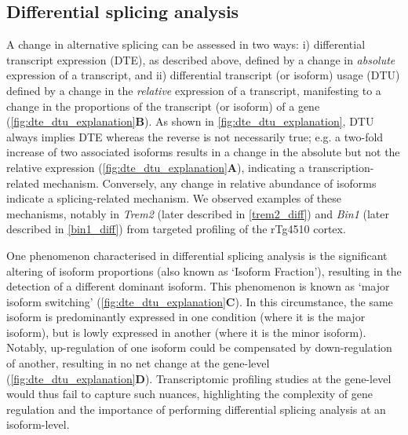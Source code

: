 \subsection{Differential splicing analysis}\label{intro:dtu}
A change in alternative splicing can be assessed in two ways: i) differential transcript expression (DTE), as described above, defined by a change in \textit{absolute} expression of a transcript, and ii) differential transcript (or isoform) usage (DTU) defined by a change in the \textit{relative} expression of a transcript, manifesting to a change in the proportions of the transcript (or isoform) of a gene (\cref{fig:dte_dtu_explanation}\textbf{B}). As shown in \cref{fig:dte_dtu_explanation}, DTU always implies DTE whereas the reverse is not necessarily true; e.g. a two-fold increase of two associated isoforms results in a change in the absolute but not the relative expression (\cref{fig:dte_dtu_explanation}\textbf{A}), indicating a transcription-related mechanism. Conversely, any change in relative abundance of isoforms indicate a splicing-related mechanism. We observed examples of these mechanisms, notably in \textit{Trem2} (later described in \cref{trem2_diff}) and \textit{Bin1} (later described in \cref{bin1_diff}) from targeted profiling of the rTg4510 cortex.

One phenomenon characterised in differential splicing analysis is the significant altering of isoform proportions (also known as ‘Isoform Fraction'), resulting in the detection of a different dominant isoform. This phenomenon is known as ‘major isoform switching' (\cref{fig:dte_dtu_explanation}\textbf{C}). In this circumstance, the same isoform is predominantly expressed in one condition (where it is the major isoform), but is lowly expressed in another (where it is the minor isoform). Notably, up-regulation of one isoform could be compensated by down-regulation of another, resulting in no net change at the gene-level (\cref{fig:dte_dtu_explanation}\textbf{D}). Transcriptomic profiling studies at the gene-level would thus fail to capture such nuances, highlighting the complexity of gene regulation and the importance of performing differential splicing analysis at an isoform-level. 


